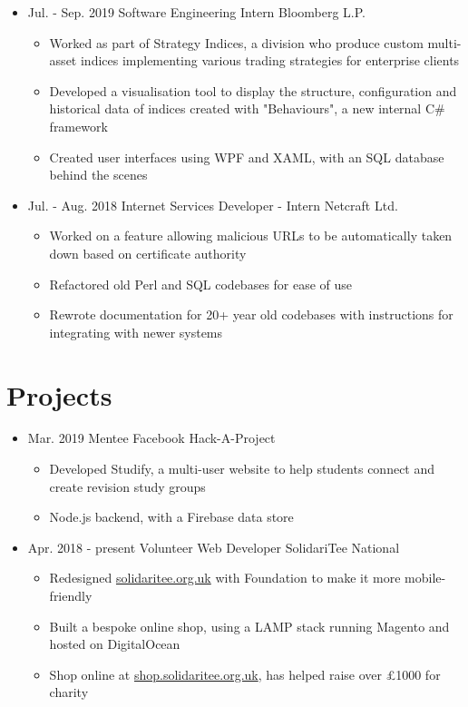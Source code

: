 \documentclass[11pt,a4paper,sans]{moderncv}        %
\begin{document}
\begin{itemize}

\item{
\cventry
{Jul. - Sep. 2019}
{Software Engineering Intern}
{Bloomberg L.P.}
{}{}{
\begin{itemize}
\item Worked as part of Strategy Indices, a division who produce custom multi-asset indices implementing various trading strategies for enterprise clients
\item Developed a visualisation tool to display the structure, configuration and historical data of indices created with "Behaviours", a new internal C\# framework
\item Created user interfaces using WPF and XAML, with an SQL database behind the scenes
\end{itemize}
}}

\item{
\cventry
{Jul. - Aug. 2018}
{Internet Services Developer - Intern}
{Netcraft Ltd.}
{}{}{
\begin{itemize}
\item Worked on a feature allowing malicious URLs to be automatically taken down based on certificate authority
\item Refactored old Perl and SQL codebases for ease of use
\item Rewrote documentation for 20+ year old codebases with instructions for integrating with newer systems
\end{itemize}
}}

\end{itemize}

\section{Projects}

\begin{itemize}

\item{
\cventry
{Mar. 2019}
{Mentee}
{Facebook Hack-A-Project}
{}{}{
\begin{itemize}
\item Developed Studify, a multi-user website to help students connect and create revision study groups
\item Node.js backend, with a Firebase data store
\end{itemize}
}}

\item{
\cventry
{Apr. 2018 - present}
{Volunteer Web Developer}
{SolidariTee National}
{}{}{
\begin{itemize}
\item Redesigned \href{https://www.solidaritee.org.uk/}{solidaritee.org.uk} with Foundation to make it more mobile-friendly
\item Built a bespoke online shop, using a LAMP stack running Magento and hosted on DigitalOcean
\item Shop online at \href{https://shop.solidaritee.org.uk/}{shop.solidaritee.org.uk}, has helped raise over £1000 for charity
\end{itemize}
}}

\end{itemize}
\end{document}
